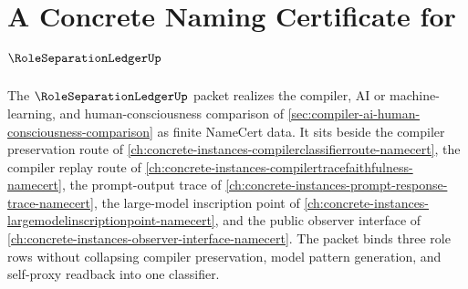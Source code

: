 \chapter{A Concrete Naming Certificate for $\RoleSeparationLedgerUp$}
\label{ch:concrete-instances-role-separation-ledger-namecert}

The $\RoleSeparationLedgerUp$ packet realizes the compiler, AI or machine-learning, and human-consciousness comparison of \autoref{sec:compiler-ai-human-consciousness-comparison} as finite NameCert data. It sits beside the compiler preservation route of \autoref{ch:concrete-instances-compilerclassifierroute-namecert}, the compiler replay route of \autoref{ch:concrete-instances-compilertracefaithfulness-namecert}, the prompt-output trace of \autoref{ch:concrete-instances-prompt-response-trace-namecert}, the large-model inscription point of \autoref{ch:concrete-instances-largemodelinscriptionpoint-namecert}, and the public observer interface of \autoref{ch:concrete-instances-observer-interface-namecert}. The packet binds three role rows without collapsing compiler preservation, model pattern generation, and self-proxy readback into one classifier.

